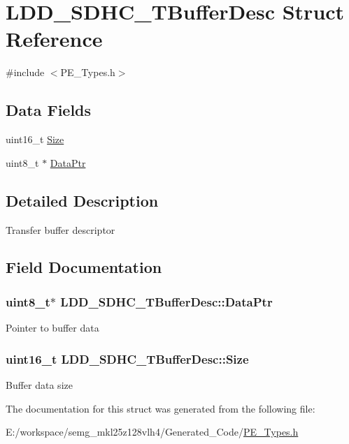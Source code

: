 \hypertarget{struct_l_d_d___s_d_h_c___t_buffer_desc}{\section{L\-D\-D\-\_\-\-S\-D\-H\-C\-\_\-\-T\-Buffer\-Desc Struct Reference}
\label{struct_l_d_d___s_d_h_c___t_buffer_desc}
}


{\ttfamily \#include $<$P\-E\-\_\-\-Types.\-h$>$}

\subsection*{Data Fields}
\begin{DoxyCompactItemize}
\item 
uint16\-\_\-t \hyperlink{struct_l_d_d___s_d_h_c___t_buffer_desc_a117f5acff1ada72194a95b38795bca56}{Size}
\item 
uint8\-\_\-t $\ast$ \hyperlink{struct_l_d_d___s_d_h_c___t_buffer_desc_a0349f594a37791792e4a213111173a68}{Data\-Ptr}
\end{DoxyCompactItemize}


\subsection{Detailed Description}
Transfer buffer descriptor 

\subsection{Field Documentation}
\hypertarget{struct_l_d_d___s_d_h_c___t_buffer_desc_a0349f594a37791792e4a213111173a68}{
\subsubsection[{Data\-Ptr}]{\setlength{\rightskip}{0pt plus 5cm}uint8\-\_\-t$\ast$ L\-D\-D\-\_\-\-S\-D\-H\-C\-\_\-\-T\-Buffer\-Desc\-::\-Data\-Ptr}}\label{struct_l_d_d___s_d_h_c___t_buffer_desc_a0349f594a37791792e4a213111173a68}
Pointer to buffer data \hypertarget{struct_l_d_d___s_d_h_c___t_buffer_desc_a117f5acff1ada72194a95b38795bca56}{
\subsubsection[{Size}]{\setlength{\rightskip}{0pt plus 5cm}uint16\-\_\-t L\-D\-D\-\_\-\-S\-D\-H\-C\-\_\-\-T\-Buffer\-Desc\-::\-Size}}\label{struct_l_d_d___s_d_h_c___t_buffer_desc_a117f5acff1ada72194a95b38795bca56}
Buffer data size 

The documentation for this struct was generated from the following file\-:\begin{DoxyCompactItemize}
\item 
E\-:/workspace/semg\-\_\-mkl25z128vlh4/\-Generated\-\_\-\-Code/\hyperlink{_p_e___types_8h}{P\-E\-\_\-\-Types.\-h}\end{DoxyCompactItemize}

